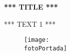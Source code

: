 \documentclass[a4paper]{article}
\newcommand{\titulo}{*** TITLE ***}
\newcommand{\subtitulo}{*** SUBTITLE ***}
\newcommand{\primertexto}{*** TEXT 1 ***}
\newcommand{\fotoPortada}{*** COVER IMAGE PATH ***}
\begin{document}
    \begin{titlepage}
        \centering
        {\bfseries \fontsize{24}{28}\selectfont \textcolor{colorTitulo}{\titulo}} \\[2cm]
        \par\vspace{1cm}
        \primertexto
        \par\vspace{8cm}
    \end{titlepage}


    \begin{figure}
    \centering
    \texttt{[image: \\fotoPortada]}
    \end{figure}
\end{document}
